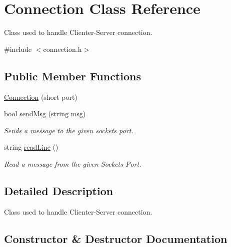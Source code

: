 \hypertarget{class_connection}{}\section{Connection Class Reference}
\label{class_connection}


Class used to handle Clienter-\/\+Server connection.  




{\ttfamily \#include $<$connection.\+h$>$}

\subsection*{Public Member Functions}
\begin{DoxyCompactItemize}
\item 
\hyperlink{class_connection_a8089476d48ba545f44e691cd4bd0278d}{Connection} (short port)
\item 
bool \hyperlink{class_connection_a4b9f6db1fb42fc9857f829fa0bc52e6e}{send\+Msg} (string msg)
\begin{DoxyCompactList}\small\item\em Sends a message to the given socket\textquotesingle{}s port. \end{DoxyCompactList}\item 
\hypertarget{class_connection_a1df16b436751b686d96c24ca0c498659}{}\label{class_connection_a1df16b436751b686d96c24ca0c498659} 
string \hyperlink{class_connection_a1df16b436751b686d96c24ca0c498659}{read\+Line} ()
\begin{DoxyCompactList}\small\item\em Read a message from the given Socket\textquotesingle{}s Port. \end{DoxyCompactList}\end{DoxyCompactItemize}


\subsection{Detailed Description}
Class used to handle Clienter-\/\+Server connection. 

\subsection{Constructor \& Destructor Documentation}
\hypertarget{class_connection_a8089476d48ba545f44e691cd4bd0278d}{}\label{class_connection_a8089476d48ba545f44e691cd4bd0278d} 
